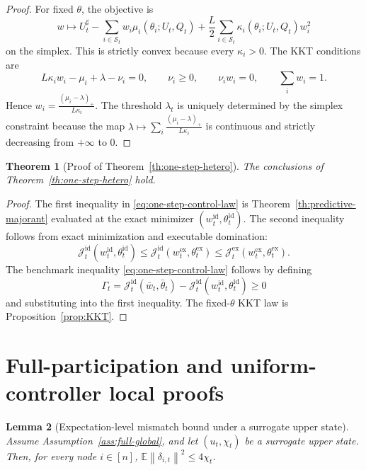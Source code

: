 \documentclass{article}
\newtheorem{theorem}{Theorem}[section]
\newtheorem{lemma}[theorem]{Lemma}
\theoremstyle{definition}
\newcommand{\EE}{\mathbb E}
\newcommand{\norm}[1]{\left\lVert #1\right\rVert}
\begin{document}
\begin{proof}
For fixed $\theta$, the objective is
\[
w\mapsto
U_t^\sharp-\sum_{i\in\mathcal S_t}w_i \mu_i(\theta_i;U_t,Q_t)
+
\frac{L}{2}\sum_{i\in\mathcal S_t}\kappa_i(\theta_i;U_t,Q_t) w_i^2
\]
on the simplex. This is strictly convex because every $\kappa_i>0$. The KKT
conditions are
\[
L\kappa_i w_i-\mu_i+\lambda-\nu_i=0,
\qquad
\nu_i\ge 0,
\qquad
\nu_i w_i=0,
\qquad
\sum_i w_i=1.
\]
Hence $
w_i=\frac{(\mu_i-\lambda)_+}{L\kappa_i}$.
The threshold $\lambda_t$ is uniquely determined by the simplex constraint
because the map $
\lambda\mapsto \sum_i \frac{(\mu_i-\lambda)_+}{L\kappa_i}$
is continuous and strictly decreasing from $+\infty$ to $0$.
\end{proof}

\begin{theorem}[Proof of Theorem~\ref{th:one-step-hetero}]
\label{th:one-step-hetero-proof}
The conclusions of Theorem~\ref{th:one-step-hetero} hold.
\end{theorem}

\begin{proof}
The first inequality in \eqref{eq:one-step-control-law} is
Theorem~\ref{th:predictive-majorant} evaluated at the exact minimizer
$(w_t^{\mathrm{id}},\theta_t^{\mathrm{id}})$. The second inequality follows from
exact minimization and executable domination:
\[
\mathcal J_t^{\mathrm{id}}(w_t^{\mathrm{id}},\theta_t^{\mathrm{id}})
\le
\mathcal J_t^{\mathrm{id}}(w_t^{\mathrm{ex}},\theta_t^{\mathrm{ex}})
\le
\mathcal J_t^{\mathrm{ex}}(w_t^{\mathrm{ex}},\theta_t^{\mathrm{ex}}).
\]
The benchmark inequality \eqref{eq:one-step-control-law} follows by defining
\[
\Gamma_t
=
\mathcal J_t^{\mathrm{id}}(\bar w_t,\bar\theta_t)
-
\mathcal J_t^{\mathrm{id}}(w_t^{\mathrm{id}},\theta_t^{\mathrm{id}})\ge 0
\]
and substituting into the first inequality. The fixed-$\theta$ KKT law is
Proposition~\ref{prop:KKT}.
\end{proof}

\section{Full-participation and uniform-controller local proofs}
\begin{lemma}[Expectation-level mismatch bound under a surrogate upper state]
\label{lem:delta-sur}
Assume Assumption~\ref{ass:full-global}, and let $(u_t,\chi_t)$ be a surrogate
upper state. Then, for every node $i\in[n]$,
$\EE\norm{\delta_{i,t}}^2\le 4\chi_t$.
\end{lemma}
\end{document}
